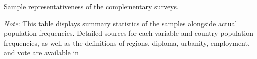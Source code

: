\begin{table}[h!]
    \caption[Sample representativeness of US1, US2, Eu]{Sample representativeness of the complementary surveys.} \label{tab:representativeness_waves}
    \makebox[\textwidth][c]{
        \resizebox*{!}{.80\textheight}{%
        
        }
    }
    {\footnotesize \textit{Note}: This table displays summary statistics of the samples alongside actual population frequencies. %
    Detailed sources for each variable and country population frequencies, as well as the definitions of regions, diploma, urbanity, employment, and vote are available in %
    } %
\end{table}

